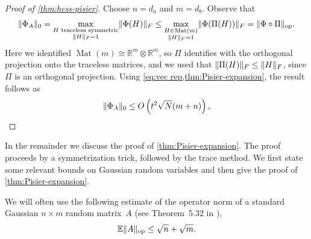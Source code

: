 \documentclass[aos]{imsart}
\theoremstyle{definition}
\numberwithin{equation}{section}
\DeclareMathOperator{\op}{op}
\DeclareMathOperator{\Mat}{Mat}
\DeclarePairedDelimiter{\norm}{\lVert}{\rVert}
\newcommand{\R}{{\mathbb{R}}}
\newcommand{\ot}{\otimes}
\newcommand{\E}{\mathbb{E}}
\newcommand{\MW}[1]{{\color{red}[MW: #1]}}
\newcommand{\MW}[1]{{}}
\begin{document}
\begin{appendix}
\begin{proof}[Proof of \cref{thm:hess-pisier}]
Choose $n=d_a$ and $m=d_b$.
Observe that
\begin{align*}
  \norm{\Phi_A}_0
= \max_{\substack{H \text{ traceless symmetric} \\ \norm H_F=1}} \norm{\Phi(H)}_F
\leq %
\max_{\substack{H \in \Mat(m) \\ \norm H_F = 1}} \norm{\Phi(\Pi(H))}_F
= \norm{\Phi \circ \Pi}_{\op}.
\end{align*}
Here we identified $\Mat(m) \cong \R^m \ot \R^m$, so $\Pi$ identifies with the orthogonal projection onto the traceless matrices, and we used that $\norm{\Pi(H)}_F \leq \norm{H}_F$, since $\Pi$ is an orthogonal projection.
Using \cref{eq:vec rep,thm:Pisier-expansion}, the result follows as
\begin{align*}
  \norm{\Phi_A}_0 \leq O\left( t^2 \sqrt{N} (m+n) \right),
\end{align*}
\end{proof}

In the remainder we discuss the proof of \cref{thm:Pisier-expansion}.
The proof proceeds by a symmetrization trick, followed by the trace method.
We first state some relevant bounds on Gaussian random variables and then give the proof of \cref{thm:Pisier-expansion}.

We will often use the following estimate of the operator norm of a standard Gaussian $n \times m$ random matrix~$A$ (see Theorem~5.32 in \cite{vershynin2010introduction}),
\begin{equation}\label{eq:op norm upper bound}
  \E \norm{A}_{\op} \leq \sqrt{n} + \sqrt{m}  . 
\end{equation}


\end{appendix}
\end{document}
